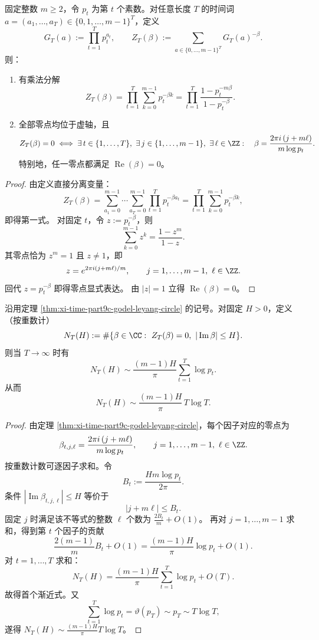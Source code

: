 \begin{theorem}\label{thm:xi-time-part9c-godel-leyang-circle}
固定整数 \(m\ge 2\)，令 \(p_t\) 为第 \(t\) 个素数。对任意长度 \(T\) 的时间词
\(
a=(a_1,\dots,a_T)\in\{0,1,\dots,m-1\}^T
\)，定义
\[
G_T(a):=\prod_{t=1}^{T}p_t^{a_t},
\qquad
Z_T(\beta):=\sum_{a\in\{0,\dots,m-1\}^T}G_T(a)^{-\beta}.
\]
则：
\begin{enumerate}
  \item 有乘法分解
  \[
  Z_T(\beta)=\prod_{t=1}^{T}\sum_{k=0}^{m-1}p_t^{-\beta k}
  =\prod_{t=1}^{T}\frac{1-p_t^{-m\beta}}{1-p_t^{-\beta}}.
  \]
  \item 全部零点均位于虚轴，且
  \[
  Z_T(\beta)=0
  \iff
  \exists\,t\in\{1,\dots,T\},\ \exists\,j\in\{1,\dots,m-1\},\ \exists\,\ell\in\ZZ:
  \quad
  \beta=\frac{2\pi i\,(j+m\ell)}{m\log p_t}.
  \]
  特别地，任一零点都满足 \(\operatorname{Re}(\beta)=0\)。
\end{enumerate}
\end{theorem}
\begin{proof}
由定义直接分离变量：
\[
Z_T(\beta)
=\sum_{a_1=0}^{m-1}\cdots\sum_{a_T=0}^{m-1}\prod_{t=1}^Tp_t^{-\beta a_t}
=\prod_{t=1}^{T}\sum_{k=0}^{m-1}p_t^{-\beta k},
\]
即得第一式。
对固定 \(t\)，令 \(z:=p_t^{-\beta}\)，则
\[
\sum_{k=0}^{m-1}z^k=\frac{1-z^m}{1-z}.
\]
其零点恰为 \(z^m=1\) 且 \(z\neq 1\)，即
\[
z=e^{2\pi i(j+m\ell)/m},
\qquad
j=1,\dots,m-1,\ \ell\in\ZZ.
\]
回代 \(z=p_t^{-\beta}\) 即得零点显式表达。
由 \(|z|=1\) 立得 \(\operatorname{Re}(\beta)=0\)。
\end{proof}

\begin{theorem}\label{thm:xi-time-part9c-godel-leyang-zero-count}
沿用定理 \ref{thm:xi-time-part9c-godel-leyang-circle} 的记号。对固定 \(H>0\)，定义（按重数计）
\[
N_T(H):=\#\{\beta\in\CC:\ Z_T(\beta)=0,\ |\operatorname{Im}\beta|\le H\}.
\]
则当 \(T\to\infty\) 时有
\[
N_T(H)\sim \frac{(m-1)H}{\pi}\sum_{t=1}^{T}\log p_t.
\]
从而
\[
N_T(H)\sim \frac{(m-1)H}{\pi}\,T\log T.
\]
\end{theorem}
\begin{proof}
由定理 \ref{thm:xi-time-part9c-godel-leyang-circle}，每个因子对应的零点为
\[
\beta_{t,j,\ell}
=\frac{2\pi i\,(j+m\ell)}{m\log p_t},
\qquad
j=1,\dots,m-1,\ \ell\in\ZZ.
\]
按重数计数可逐因子求和。令
\[
B_t:=\frac{Hm\log p_t}{2\pi}.
\]
条件 \(|\operatorname{Im}\beta_{t,j,\ell}|\le H\) 等价于
\[
|j+m\ell|\le B_t.
\]
固定 \(j\) 时满足该不等式的整数 \(\ell\) 个数为
\(
\frac{2B_t}{m}+O(1)
\)。
再对 \(j=1,\dots,m-1\) 求和，得到第 \(t\) 个因子的贡献
\[
\frac{2(m-1)}{m}B_t+O(1)
=\frac{(m-1)H}{\pi}\log p_t+O(1).
\]
对 \(t=1,\dots,T\) 求和：
\[
N_T(H)
=\frac{(m-1)H}{\pi}\sum_{t=1}^{T}\log p_t+O(T).
\]
故得首个渐近式。又
\[
\sum_{t=1}^{T}\log p_t=\vartheta(p_T)\sim p_T\sim T\log T,
\]
遂得
\(
N_T(H)\sim \frac{(m-1)H}{\pi}T\log T
\)。
\end{proof}

